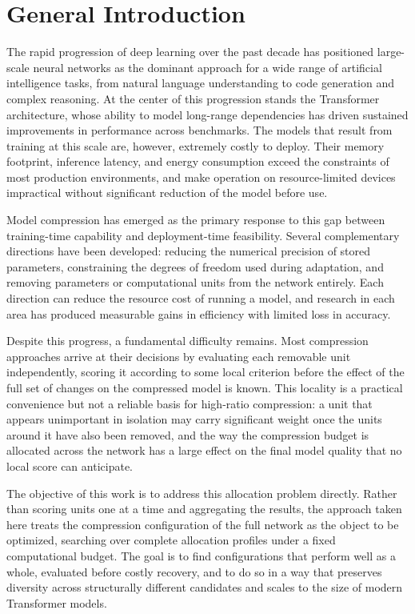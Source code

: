 \chapter*{General Introduction}
\label{chap:introduction}

The rapid progression of deep learning over the past decade has positioned large-scale
neural networks as the dominant approach for a wide range of artificial intelligence tasks,
from natural language understanding to code generation and complex reasoning.
At the center of this progression stands the Transformer architecture, whose ability to model
long-range dependencies has driven sustained improvements in performance across benchmarks.
The models that result from training at this scale are, however, extremely costly to deploy.
Their memory footprint, inference latency, and energy consumption exceed the constraints
of most production environments, and make operation on resource-limited devices impractical
without significant reduction of the model before use.

Model compression has emerged as the primary response to this gap between training-time
capability and deployment-time feasibility.
Several complementary directions have been developed: reducing the numerical precision of
stored parameters, constraining the degrees of freedom used during adaptation, and removing
parameters or computational units from the network entirely.
Each direction can reduce the resource cost of running a model, and research in each area
has produced measurable gains in efficiency with limited loss in accuracy.

Despite this progress, a fundamental difficulty remains.
Most compression approaches arrive at their decisions by evaluating each removable unit
independently, scoring it according to some local criterion before the effect of the full
set of changes on the compressed model is known.
This locality is a practical convenience but not a reliable basis for high-ratio compression:
a unit that appears unimportant in isolation may carry significant weight once the units
around it have also been removed, and the way the compression budget is allocated across
the network has a large effect on the final model quality that no local score can anticipate.

The objective of this work is to address this allocation problem directly.
Rather than scoring units one at a time and aggregating the results, the approach taken
here treats the compression configuration of the full network as the object to be optimized,
searching over complete allocation profiles under a fixed computational budget.
The goal is to find configurations that perform well as a whole, evaluated before costly
recovery, and to do so in a way that preserves diversity across structurally different
candidates and scales to the size of modern Transformer models.

